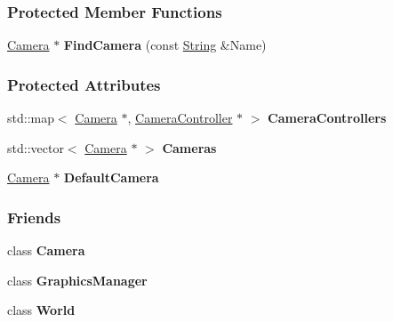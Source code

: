 \subsubsection*{Protected Member Functions}
\begin{DoxyCompactItemize}
\item 
\hypertarget{classMezzanine_1_1CameraManager_ae96502bb30b93a57de58a2bbd8e7903a}{
\hyperlink{classMezzanine_1_1Camera}{Camera} $\ast$ {\bfseries FindCamera} (const \hyperlink{namespaceMezzanine_acf9fcc130e6ebf08e3d8491aebcf1c86}{String} \&Name)}
\label{classMezzanine_1_1CameraManager_ae96502bb30b93a57de58a2bbd8e7903a}

\end{DoxyCompactItemize}
\subsubsection*{Protected Attributes}
\begin{DoxyCompactItemize}
\item 
\hypertarget{classMezzanine_1_1CameraManager_a77e86d6a48fe53284be6805c4c8ac8bc}{
std::map$<$ \hyperlink{classMezzanine_1_1Camera}{Camera} $\ast$, \hyperlink{classMezzanine_1_1CameraController}{CameraController} $\ast$ $>$ {\bfseries CameraControllers}}
\label{classMezzanine_1_1CameraManager_a77e86d6a48fe53284be6805c4c8ac8bc}

\item 
\hypertarget{classMezzanine_1_1CameraManager_ad96fededfedccc6019801f0b99931829}{
std::vector$<$ \hyperlink{classMezzanine_1_1Camera}{Camera} $\ast$ $>$ {\bfseries Cameras}}
\label{classMezzanine_1_1CameraManager_ad96fededfedccc6019801f0b99931829}

\item 
\hypertarget{classMezzanine_1_1CameraManager_a3d777350cf282899968ab7a83f76b3ec}{
\hyperlink{classMezzanine_1_1Camera}{Camera} $\ast$ {\bfseries DefaultCamera}}
\label{classMezzanine_1_1CameraManager_a3d777350cf282899968ab7a83f76b3ec}

\end{DoxyCompactItemize}
\subsubsection*{Friends}
\begin{DoxyCompactItemize}
\item 
\hypertarget{classMezzanine_1_1CameraManager_ad8bd9afbbd7af19d996da80e9d25890d}{
class {\bfseries Camera}}
\label{classMezzanine_1_1CameraManager_ad8bd9afbbd7af19d996da80e9d25890d}

\item 
\hypertarget{classMezzanine_1_1CameraManager_ad65eae853be6e1a35bf85e6865583560}{
class {\bfseries GraphicsManager}}
\label{classMezzanine_1_1CameraManager_ad65eae853be6e1a35bf85e6865583560}

\item 
\hypertarget{classMezzanine_1_1CameraManager_a7b4bcdf992c21ae83363f25df05b1d25}{
class {\bfseries World}}
\label{classMezzanine_1_1CameraManager_a7b4bcdf992c21ae83363f25df05b1d25}

\end{DoxyCompactItemize}



